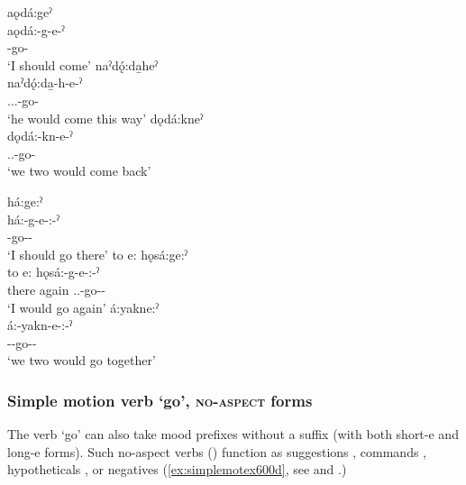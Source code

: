 \ea\label{ex:simplemotex15} 
\ea aǫdá:geˀ\\
\gll aǫdá:-g-e-ˀ\\
 {\indefinitecislocative}-go-{\punctual}\\
\glt `I should come'
\ex naˀdǫ́:da̱heˀ\\
\gll naˀdǫ́:da̱-h-e-ˀ\\
 {\partitive.\dualic.\indefinite.\cislocative}-go-{\punctual}\\
\glt `he would come this way'
\newpage
\ex dǫdá:kneˀ\\
\gll dǫdá:-kn-e-ˀ\\
 {\dualic.\indefinite.\cislocative}-go-{\punctual}\\
\glt `we two would come back'
\z
\z

\ea\label{ex:simplemotex16} 
\ea há:ge:ˀ\\
\gll há:-g-e-:-ˀ\\
 {\translocativeindefinite}-go-{\purposive}-{\punctual}\\
\glt `I should go there'
\ex to e: hǫsá:ge:ˀ\\
\gll to e: hǫsá:-g-e-:-ˀ\\
there again {\translocative.\repetitive.\indefinite}-go-{\purposive}-{\punctual}\\
\glt `I would go again'
\ex á:yakne:ˀ\\
\gll á:-yakn-e-:-ˀ\\
 {\indefinite}--go-{\purposive}-{\punctual}\\
\glt `we two would go together'
\z
\z

\subsubsection*{Simple motion verb  ‘go’, \textsc{no-aspect} forms}\label{simple motion no-aspect}
The verb  ‘go’ can also take mood prefixes without a  \textsc{\punctual} suffix (with both short-e  and long-e  forms). Such no-aspect verbs () function as suggestions , commands , hypotheticals , or negatives (\ref{ex:simplemotex600d}, see  and .)

